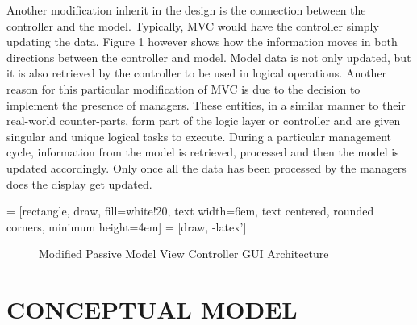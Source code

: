 \documentclass[10pt,twocolumn]{witseiepaper}
\begin{document}
Another modification inherit in the design is the connection between the controller and the model. Typically, MVC would have the controller simply updating the data. Figure 1 however shows how the information moves in both directions between the controller and model. Model data is not only updated, but it is also retrieved by the controller to be used in logical operations. Another reason for this particular modification of MVC is due to the decision to implement the presence of managers. These entities, in a similar manner to their real-world counter-parts, form part of the logic layer or controller and are given singular and unique logical tasks to execute. During a particular management cycle, information from the model is retrieved, processed and then the model is updated accordingly. Only once all the data has been processed by the managers does the display get updated.  

 = [rectangle, draw, fill=white!20, 
    text width=6em, text centered, rounded corners, minimum height=4em]
 = [draw, -latex']

\begin{figure}[h]
\centering
{}
\caption{Modified Passive Model View Controller GUI Architecture}
\end{figure}



%
\section{CONCEPTUAL MODEL} %
\end{document}
